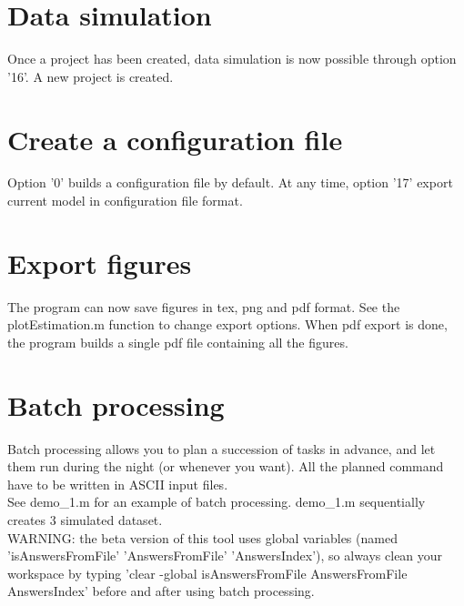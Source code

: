 \documentclass{book}
\begin{document}
\section{Data simulation}
Once a project has been created, data simulation is now possible through option '16'.
A new project is created.

\section{Create a configuration file}
Option '0' builds a configuration file by default.
At any time, option '17' export current model in configuration file format.

\section{Export figures}
The program can now save figures in tex, png and pdf format.
See the plotEstimation.m function to change export options.
When pdf export is done, the program builds a single pdf file containing all the figures.

\section{Batch processing}

Batch processing allows you to plan a succession of tasks in advance, and let them run during the night (or whenever you want).
All the planned command have to be written in ASCII input files.\\

See demo\_1.m for an example of batch processing. demo\_1.m sequentially creates 3 simulated dataset.\\

WARNING: the beta version of this tool uses global variables (named 'isAnswersFromFile' 'AnswersFromFile' 'AnswersIndex'), so always clean your workspace by typing 'clear -global isAnswersFromFile AnswersFromFile AnswersIndex' before and after using batch processing.

\newpage
\end{document}
